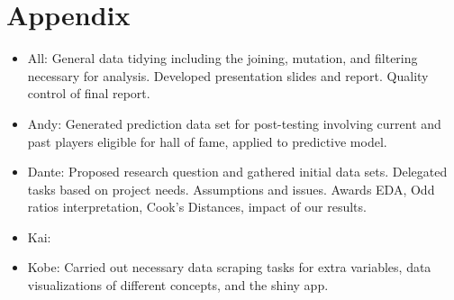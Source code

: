 \documentclass[
]{article}
\providecommand{\tightlist}{%
  \setlength{\itemsep}{0pt}\setlength{\parskip}{0pt}}
\begin{document}
\hypertarget{appendix}{%
\section{Appendix}\label{appendix}}

\begin{itemize}
\tightlist
\item
  All: General data tidying including the joining, mutation, and
  filtering necessary for analysis. Developed presentation slides and
  report. Quality control of final report.
\item
  Andy: Generated prediction data set for post-testing involving current
  and past players eligible for hall of fame, applied to predictive
  model.\\
\item
  Dante: Proposed research question and gathered initial data sets.
  Delegated tasks based on project needs. Assumptions and issues. Awards
  EDA, Odd ratios interpretation, Cook's Distances, impact of our
  results.
\item
  Kai:
\item
  Kobe: Carried out necessary data scraping tasks for extra variables,
  data visualizations of different concepts, and the shiny app.
\end{itemize}
\end{document}
